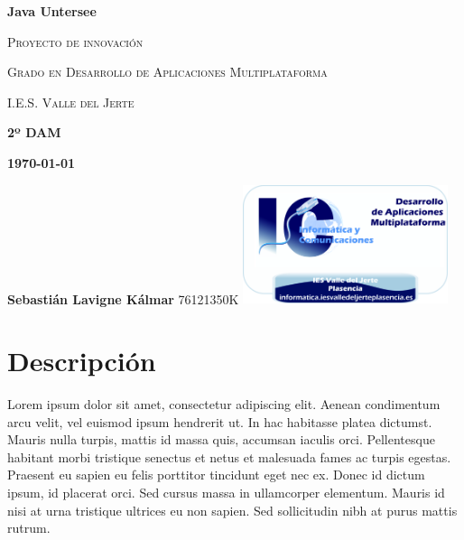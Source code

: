 \documentclass[a4paper,
	11pt,
	parskip=full,
	bibliography=totoc,
	twoside
	]{scrartcl}
\let\oldsection\section
\def\section{\cleardoubleoddpage\oldsection}
\begin{document}
%

\cleardoubleoddpage
\begin{titlepage}
	{\space}
	\vspace{5cm}
	\centering
	{\rmfamily\bfseries\Huge Java Untersee\par}
	\vspace{1.5cm}
	{\rmfamily\scshape\LARGE Proyecto de innovación\par}
	\vspace{1.5cm}
	{\rmfamily\scshape\LARGE Grado en Desarrollo de Aplicaciones Multiplataforma \par}
	\vspace{0.2cm}
	{\rmfamily\scshape\Huge I.E.S. Valle del Jerte \par}
	\vspace{1cm}
	\raggedleft
	\vfill
	{\rmfamily\bfseries\large 2º DAM\linebreak}
	{\rmfamily\bfseries\large\today\par}
	\vspace{1cm}
	{\rmfamily\bfseries\Large Sebastián Lavigne Kálmar\linebreak}
	{76121350K}
	\vfill
	\includegraphics[width=6cm]{img/DAM_iesvallejerteplasencia.png}
	
	
	
\end{titlepage}

\cleardoubleoddpage
\tableofcontents

\doublespacing

\cleardoubleoddpage
\section{Descripción}
	
	
	Lorem ipsum dolor sit amet, consectetur adipiscing elit. Aenean condimentum arcu velit, vel euismod ipsum hendrerit ut. In hac habitasse platea dictumst. Mauris nulla turpis, mattis id massa quis, accumsan iaculis orci. Pellentesque habitant morbi tristique senectus et netus et malesuada fames ac turpis egestas. Praesent eu sapien eu felis porttitor tincidunt eget nec ex. Donec id dictum ipsum, id placerat orci. Sed cursus massa in ullamcorper elementum. Mauris id nisi at urna tristique ultrices eu non sapien. Sed sollicitudin nibh at purus mattis rutrum.
	
\end{document}
